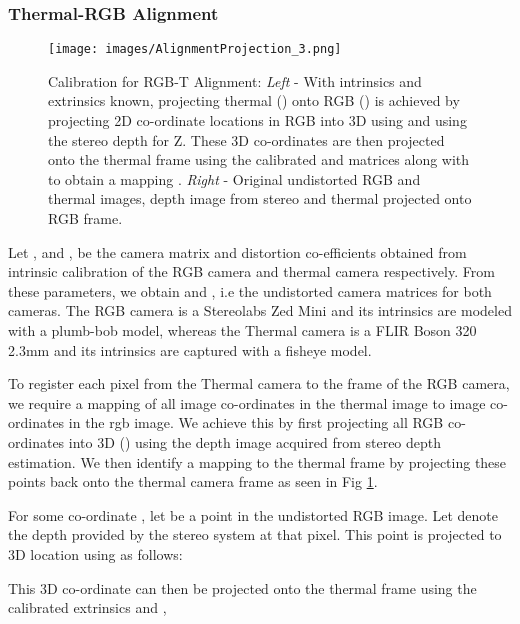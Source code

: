\documentclass[letterpaper, 10 pt, conference]{ieeeconf}
\begin{document}
\subsubsection{Thermal-RGB Alignment}

\begin{figure}[t]
\begin{center}
\vspace{0.15cm}
\texttt{[image: images/AlignmentProjection\_3.png]}
\vspace{-0.25cm}
\end{center}
   \caption{Calibration for RGB-T Alignment: \textit{Left} - With intrinsics and extrinsics known, projecting thermal () onto RGB () is achieved by projecting 2D co-ordinate locations in RGB into 3D using  and using the stereo depth for Z. These 3D co-ordinates are then projected onto the thermal frame using the calibrated  and  matrices along with  to obtain a mapping . \textit{Right} - Original undistorted RGB and thermal images, depth image from stereo and thermal projected onto RGB frame.}
\label{fig:rgbt_alignment}
\vspace{-0.25cm}
\end{figure}

Let ,  and ,  be the camera matrix and distortion co-efficients obtained from intrinsic calibration of the RGB camera and thermal camera respectively. From these parameters, we obtain  and , i.e the undistorted camera matrices for both cameras. The RGB camera is a Stereolabs Zed Mini and its intrinsics are modeled with a plumb-bob model, whereas the Thermal camera is a FLIR Boson 320 2.3mm and its intrinsics are captured with a fisheye model.


To register each pixel from the Thermal camera to the frame of the RGB camera, we require a mapping of all image co-ordinates  in the thermal image to image co-ordinates  in the rgb image. We achieve this by first projecting all RGB co-ordinates into 3D () using the depth image  acquired from stereo depth estimation. We then identify a mapping to the thermal frame by projecting these points back onto the thermal camera frame as seen in Fig \ref{fig:rgbt_alignment}. 

For some co-ordinate , let  be a point in the undistorted RGB image. Let   denote the depth provided by the stereo system at that pixel. This point is projected to 3D location  using  as follows:

This 3D co-ordinate  can then be projected onto the thermal frame using the calibrated extrinsics  and ,
\end{document}
